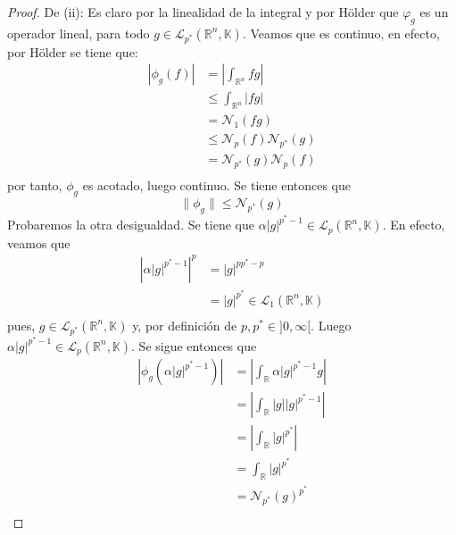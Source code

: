 \documentclass[12pt]{report}
\theoremstyle{largebreak}
\newcommand\abs[1]{\ensuremath{\left|#1\right|}}
\newcommand{\N}[2]{\ensuremath{\mathcal{N}_{#1}\left(#2\right)}}
\begin{document}
\begin{proof}
        De (ii): Es claro por la linealidad de la integral y por Hölder que $\varphi_g$ es un operador lineal, para todo $g\in\mathcal{L}_{p^*}(\mathbb{R}^n,\mathbb{K})$. Veamos que es continuo, en efecto, por Hölder se tiene que:
        \begin{equation*}
            \begin{split}
                \abs{\phi_g(f)}&=\abs{\int_{\mathbb{R}^n}fg}\\
                 &\leq\int_{\mathbb{R}^n}\abs{fg}\\
                 &=\N{1}{fg}\\
                 &\leq\N{p}{f}\N{p^*}{g}\\
                 &=\N{p^*}{g}\N{p}{f}\\
            \end{split}
        \end{equation*}
        por tanto, $\phi_g$ es acotado, luego continuo. Se tiene entonces que
        \begin{equation*}
            \|\phi_g\|\leq\N{p^*}{g}
        \end{equation*}
        Probaremos la otra desigualdad. Se tiene que $\alpha\abs{g}^{ p^*-1}\in\mathcal{L}_p(\mathbb{R}^n,\mathbb{K})$. En efecto, veamos que
        \begin{equation*}
            \begin{split}
                \abs{\alpha\abs{g}^{ p^*-1}}^p&=\abs{g}^{ pp^*-p}\\
                &=\abs{g}^{p^*}\in\mathcal{L}_1(\mathbb{R}^n,\mathbb{K}) \\
            \end{split}
        \end{equation*}
        pues, $g\in\mathcal{L}_{ p^*}(\mathbb{R}^n,\mathbb{K})$ y, por definición de $p,p^*\in]0,\infty[$. Luego $\alpha\abs{g}^{ p^*-1}\in\mathcal{L}_p(\mathbb{R}^n,\mathbb{K})$. Se sigue entonces que
        \begin{equation*}
            \begin{split}
                \abs{\phi_g(\alpha\abs{g}^{p^*-1})}&=\abs{\int_{\mathbb{R}}\alpha\abs{g}^{ p^*-1}g}\\
                &=\abs{\int_{\mathbb{R}}\abs{g}\abs{g}^{ p^*-1}}\\
                &=\abs{\int_{\mathbb{R}}\abs{g}^{ p^*}}\\
                &=\int_{\mathbb{R}}\abs{g}^{ p^*}\\
                &=\N{p^*}{g}^{p^*}\\

\end{split}
\end{equation*}
\end{proof}
\end{document}
